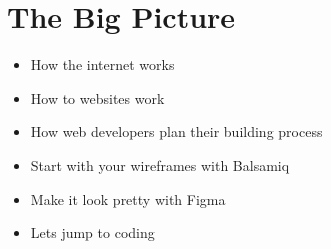 \part{The Big Picture}\label{part:the-big-picture}

\begin{itemize}
    \item How the internet works
    \item How to websites work
    \item How web developers plan their building process
    \item Start with your wireframes with Balsamiq
    \item Make it look pretty with Figma
    \item Lets jump to coding
\end{itemize}
